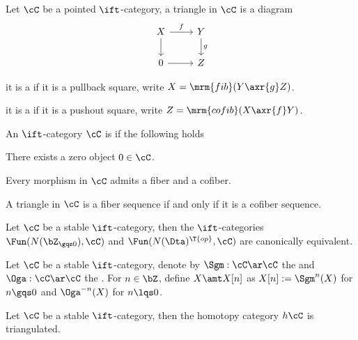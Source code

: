 \documentclass[article, a4paper, twoside]{universal}
\begin{document}
\begin{dfn}[1.1.1.4]
    Let $\cC$ be a pointed $\ift$-category, a triangle in $\cC$ is a diagram
    \[
        \begin{tikzcd}
            X\ar[r, "f"]\ar[d] & Y\ar[d, "g"] \\
            0 \ar[r] & Z
        \end{tikzcd}
    \]
    \begin{itm}
        \item it is a  if it is a pullback square, write $X=\mrm{fib}(Y\axr{g}Z)$.
        \item it is a  if it is a pushout square, write $Z=\mrm{cofib}(X\axr{f}Y)$.
    \end{itm}
\end{dfn}

\begin{dfn}[1.1.1.9]
    An $\ift$-category $\cC$ is  if the following holds
    \begin{enr}[label=(\arabic*)]
        \item There exists a zero object $0\in\cC$.
        \item Every morphism in $\cC$ admits a fiber and a cofiber.
        \item A triangle in $\cC$ is a fiber sequence if and only if it is a cofiber sequence.
    \end{enr}

\end{dfn}

\begin{thm}
    Let $\cC$ be a stable $\ift$-category, then the $\ift$-categories $\Fun(N(\bZ_{\gqs0}),\cC)$ and $\Fun(N(\Dta)^{\T{op}},\cC)$ are canonically equivalent.
\end{thm}

\begin{dfn}[1.1.2.7]
    Let $\cC$ be a stable $\ift$-category, denote by $\Sgm:\cC\ar\cC$ the  and $\Oga:\cC\ar\cC$ the . For $n\in\bZ$, define $X\amt X[n]$ as $X[n]:=\Sgm^{n}(X)$ for $n\gqs0$ and $\Oga^{-n}(X)$ for $n\lqs0$.
\end{dfn}

\begin{thm}[1.1.2.14]

    Let $\cC$ be a stable $\ift$-category, then the homotopy category $h\cC$ is triangulated.

\end{thm}
\end{document}
